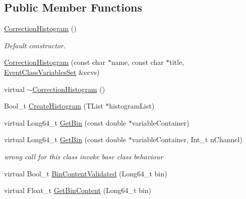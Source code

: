 \subsection*{Public Member Functions}
\begin{DoxyCompactItemize}
\item 
\mbox{\label{classQn_1_1CorrectionHistogram_afb136f75daee32c8969c1c53a4fb4802}} 
\mbox{\hyperlink{classQn_1_1CorrectionHistogram_afb136f75daee32c8969c1c53a4fb4802}{Correction\+Histogram}} ()
\begin{DoxyCompactList}\small\item\em Default constructor. \end{DoxyCompactList}\item 
\mbox{\hyperlink{classQn_1_1CorrectionHistogram_acefd77dc11928421955bd2c8550ff817}{Correction\+Histogram}} (const char $\ast$name, const char $\ast$title, \mbox{\hyperlink{classQn_1_1EventClassVariablesSet}{Event\+Class\+Variables\+Set}} \&ecvs)
\item 
virtual \mbox{\hyperlink{classQn_1_1CorrectionHistogram_a328b703cceadfac67d51947ce27992da}{$\sim$\+Correction\+Histogram}} ()
\item 
Bool\+\_\+t \mbox{\hyperlink{classQn_1_1CorrectionHistogram_a5d7baa24476a584ad144923ec2bec7a5}{Create\+Histogram}} (T\+List $\ast$histogram\+List)
\item 
virtual Long64\+\_\+t \mbox{\hyperlink{classQn_1_1CorrectionHistogram_ac67e334f0d4bae4c45727e129c9bfba1}{Get\+Bin}} (const double $\ast$variable\+Container)
\item 
\mbox{\label{classQn_1_1CorrectionHistogram_a008557e4ab70595b83f60973acc37be2}} 
virtual Long64\+\_\+t \mbox{\hyperlink{classQn_1_1CorrectionHistogram_a008557e4ab70595b83f60973acc37be2}{Get\+Bin}} (const double $\ast$variable\+Container, Int\+\_\+t n\+Channel)
\begin{DoxyCompactList}\small\item\em wrong call for this class invoke base class behaviour \end{DoxyCompactList}\item 
virtual Bool\+\_\+t \mbox{\hyperlink{classQn_1_1CorrectionHistogram_a26d4a5cb3aebf1c447bba10359224a62}{Bin\+Content\+Validated}} (Long64\+\_\+t bin)
\item 
virtual Float\+\_\+t \mbox{\hyperlink{classQn_1_1CorrectionHistogram_a469c7ca13b740d1224dcaf5c9a41eb2b}{Get\+Bin\+Content}} (Long64\+\_\+t bin)

\end{DoxyCompactItemize}
